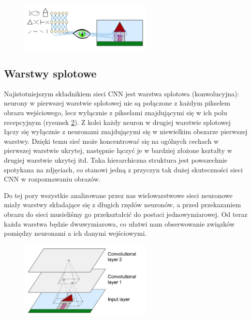 \documentclass{article}
\begin{document}
\begin{figure}[H]
	\centering
	\includegraphics[width=0.6\textwidth,keepaspectratio=true]{kora_wzrokowa}
	\caption{}
	\label{kora_wzrokowa}
\end{figure}

\subsection{Warstwy splotowe}
Najistotniejszym składnikiem sieci CNN jest warstwa splotowa (konwolucyjna): neurony w pierwszej warstwie splotowej nie są połączone z każdym pikselem obrazu wejściowego, lecz wyłącznie z pikselami znajdującymi się w ich polu recepcyjnym (rysunek \ref{warstwa_splotowa}). Z kolei każdy neuron w drugiej warstwie splotowej łączy się wyłącznie z neuronami znajdującymi się w niewielkim obszarze pierwszej warstwy. Dzięki temu sieć może koncentrować się na ogólnych cechach w pierwszej warstwie ukrytej, następnie łączyć je w bardziej złożone kształty w drugiej warstwie ukrytej itd. Taka hierarchiczna struktura jest powszechnie spotykana na zdjęciach, co stanowi jedną z przyczyn tak dużej skuteczności sieci CNN w rozpoznawaniu obrazów. \cite{geron}

Do tej pory wszystkie analizowane przez nas wielowarstwowe sieci neuronowe miały warstwy składające się z długich rzędów neuronów, a przed przekazaniem obrazu do sieci musieliśmy go przekształcić do postaci jednowymiarowej. Od teraz każda warstwa będzie dwuwymiarowa, co ułatwi nam obserwowanie związków pomiędzy neuronami a ich danymi wejściowymi. \cite{geron}
\begin{figure}[H]
	\centering
	\includegraphics[width=0.6\textwidth,keepaspectratio=true]{warstwa_splotowa}
	\caption{}
	\label{warstwa_splotowa}
\end{figure}
\end{document}
